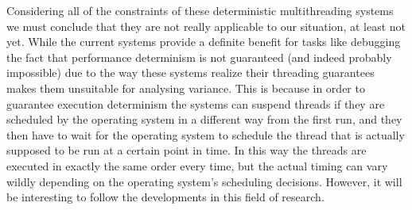 Considering all of the constraints of these deterministic multithreading
systems we must conclude that they are not really applicable to our situation,
at least not yet. While the current systems provide a definite benefit for
tasks like debugging the fact that performance determinism is not guaranteed
(and indeed probably impossible) due to the way these systems realize their
threading guarantees makes them unsuitable for analysing variance. This is
because in order to guarantee execution determinism the systems can suspend
threads if they are scheduled by the operating system in a different way from
the first run, and they then have to wait for the operating system to schedule
the thread that is actually supposed to be run at a certain point in time. In
this way the threads are executed in exactly the same order every time, but
the actual timing can vary wildly depending on the operating system's
scheduling decisions. However, it will be interesting to follow the
developments in this field of research.

